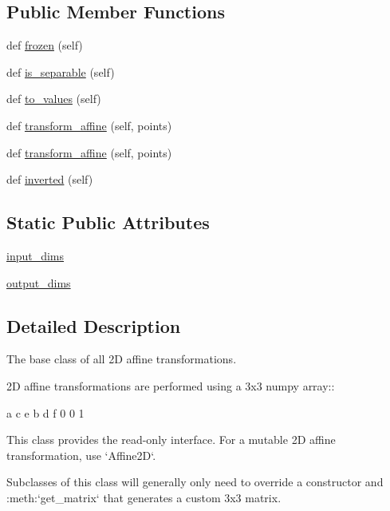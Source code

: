 \subsection*{Public Member Functions}
\begin{DoxyCompactItemize}
\item 
def \hyperlink{classmatplotlib_1_1transforms_1_1Affine2DBase_a487d5b5d9849abd8f1e454d95c5f6ee0}{frozen} (self)
\item 
def \hyperlink{classmatplotlib_1_1transforms_1_1Affine2DBase_a355d61616d1180c96e5000ffdd1d0233}{is\+\_\+separable} (self)
\item 
def \hyperlink{classmatplotlib_1_1transforms_1_1Affine2DBase_a64382ea9756c2afb114162c8d7f7fc19}{to\+\_\+values} (self)
\item 
def \hyperlink{classmatplotlib_1_1transforms_1_1Affine2DBase_adae7e13dce1c7d9b6e0bbed4818c0521}{transform\+\_\+affine} (self, points)
\item 
def \hyperlink{classmatplotlib_1_1transforms_1_1Affine2DBase_adae7e13dce1c7d9b6e0bbed4818c0521}{transform\+\_\+affine} (self, points)
\item 
def \hyperlink{classmatplotlib_1_1transforms_1_1Affine2DBase_a600f98497d32c39277a69afabb3470f3}{inverted} (self)
\end{DoxyCompactItemize}
\subsection*{Static Public Attributes}
\begin{DoxyCompactItemize}
\item 
\hyperlink{classmatplotlib_1_1transforms_1_1Affine2DBase_a6dc719c4fc6d5fdae7347de9de2892f0}{input\+\_\+dims}
\item 
\hyperlink{classmatplotlib_1_1transforms_1_1Affine2DBase_a5cf07d8560e1b9eb89e2aed2e56831bf}{output\+\_\+dims}
\end{DoxyCompactItemize}


\subsection{Detailed Description}
\begin{DoxyVerb}The base class of all 2D affine transformations.

2D affine transformations are performed using a 3x3 numpy array::

    a c e
    b d f
    0 0 1

This class provides the read-only interface.  For a mutable 2D
affine transformation, use `Affine2D`.

Subclasses of this class will generally only need to override a
constructor and :meth:`get_matrix` that generates a custom 3x3 matrix.
\end{DoxyVerb}
 


